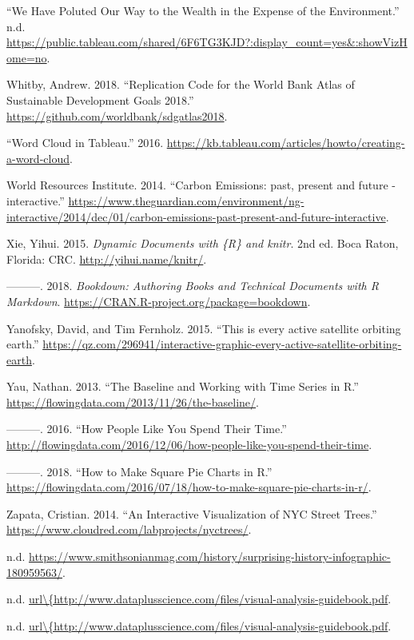 \documentclass[]{book}
\begin{document}
\leavevmode\hypertarget{ref-Yale_Climate_Opinion}{}%
``We Have Poluted Our Way to the Wealth in the Expense of the Environment.'' n.d. \url{https://public.tableau.com/shared/6F6TG3KJD?:display_count=yes\&:showVizHome=no}.

\leavevmode\hypertarget{ref-worldbankcode}{}%
Whitby, Andrew. 2018. ``Replication Code for the World Bank Atlas of Sustainable Development Goals 2018.'' \url{https://github.com/worldbank/sdgatlas2018}.

\leavevmode\hypertarget{ref-Tableau_wordcloud}{}%
``Word Cloud in Tableau.'' 2016. \url{https://kb.tableau.com/articles/howto/creating-a-word-cloud}.

\leavevmode\hypertarget{ref-CO2_emission}{}%
World Resources Institute. 2014. ``Carbon Emissions: past, present and future - interactive.'' \url{https://www.theguardian.com/environment/ng-interactive/2014/dec/01/carbon-emissions-past-present-and-future-interactive}.

\leavevmode\hypertarget{ref-xie2015}{}%
Xie, Yihui. 2015. \emph{Dynamic Documents with \{R\} and knitr}. 2nd ed. Boca Raton, Florida: CRC. \url{http://yihui.name/knitr/}.

\leavevmode\hypertarget{ref-R-bookdown}{}%
---------. 2018. \emph{Bookdown: Authoring Books and Technical Documents with R Markdown}. \url{https://CRAN.R-project.org/package=bookdown}.

\leavevmode\hypertarget{ref-Satellite}{}%
Yanofsky, David, and Tim Fernholz. 2015. ``This is every active satellite orbiting earth.'' \url{https://qz.com/296941/interactive-graphic-every-active-satellite-orbiting-earth}.

\leavevmode\hypertarget{ref-baseline_2013}{}%
Yau, Nathan. 2013. ``The Baseline and Working with Time Series in R.'' \url{https://flowingdata.com/2013/11/26/the-baseline/}.

\leavevmode\hypertarget{ref-spendingtime}{}%
---------. 2016. ``How People Like You Spend Their Time.'' \url{http://flowingdata.com/2016/12/06/how-people-like-you-spend-their-time}.

\leavevmode\hypertarget{ref-Square_Pie_Charts}{}%
---------. 2018. ``How to Make Square Pie Charts in R.'' \url{https://flowingdata.com/2016/07/18/how-to-make-square-pie-charts-in-r/}.

\leavevmode\hypertarget{ref-trees}{}%
Zapata, Cristian. 2014. ``An Interactive Visualization of NYC Street Trees.'' \url{https://www.cloudred.com/labprojects/nyctrees/}.

\leavevmode\hypertarget{ref-history_dataviz}{}%
n.d. \url{https://www.smithsonianmag.com/history/surprising-history-infographic-180959563/}.

\leavevmode\hypertarget{ref-DataVizBestPrac}{}%
n.d. \href{url/\%7Bhttp://www.dataplusscience.com/files/visual-analysis-guidebook.pdf}{url\textbackslash{}\{http://www.dataplusscience.com/files/visual-analysis-guidebook.pdf}.

\leavevmode\hypertarget{ref-dataviz_bestprac}{}%
n.d. \href{url/\%7Bhttp://www.dataplusscience.com/files/visual-analysis-guidebook.pdf}{url\textbackslash{}\{http://www.dataplusscience.com/files/visual-analysis-guidebook.pdf}.
\end{document}
